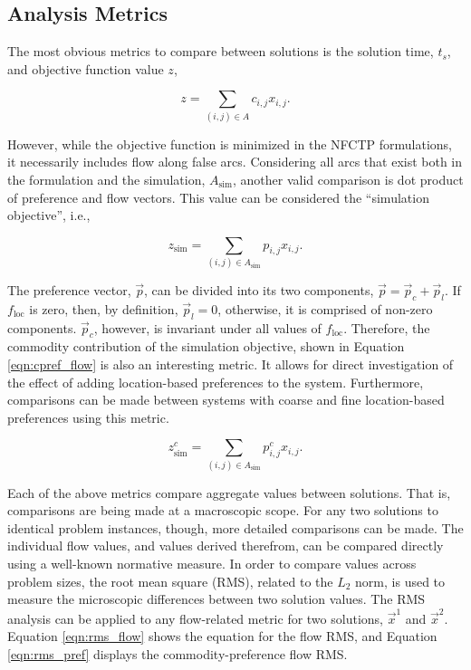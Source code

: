 \subsection{Analysis Metrics}

The most obvious metrics to compare between solutions is the solution time,
$t_s$, and objective function value $z$,

\begin{equation}\label{eqn:obj_flow}
z = \sum_{(i, j) \in A} c_{i, j} x_{i, j}.
\end{equation}

However, while the objective function is minimized in the NFCTP formulations, it
necessarily includes flow along false arcs. Considering all arcs that exist both
in the formulation and the simulation, $A_{\text{sim}}$, another valid
comparison is dot product of preference and flow vectors. This value can be
considered the ``simulation objective'', i.e.,

\begin{equation}\label{eqn:sim_flow}
z_{\text{sim}} = \sum_{(i, j) \in A_{\text{sim}}} p_{i, j} x_{i, j}.
\end{equation}

The preference vector, $\vec{p}$, can be divided into its two components,
$\vec{p} = \vec{p}_c + \vec{p}_l$. If $f_{\text{loc}}$ is zero, then, by
definition, $\vec{p}_l = 0$, otherwise, it is comprised of non-zero
components. $\vec{p}_c$, however, is invariant under all values of
$f_{\text{loc}}$. Therefore, the commodity contribution of the simulation
objective, shown in Equation \ref{eqn:cpref_flow} is also an interesting
metric. It allows for direct investigation of the effect of adding
location-based preferences to the system. Furthermore, comparisons can be made
between systems with coarse and fine location-based preferences using this
metric.

\begin{equation}\label{eqn:cpref_flow}
z^c_{\text{sim}} = \sum_{(i, j) \in A_{\text{sim}}} p^c_{i, j} x_{i, j}.
\end{equation}

Each of the above metrics compare aggregate values between solutions. That is,
comparisons are being made at a macroscopic scope. For any two solutions to
identical problem instances, though, more detailed comparisons can be made. The
individual flow values, and values derived therefrom, can be compared directly
using a well-known normative measure. In order to compare values across problem
sizes, the root mean square (RMS), related to the $L_2$ norm, is used to measure
the microscopic differences between two solution values. The RMS analysis can be
applied to any flow-related metric for two solutions, $\vec{x}^1$ and
$\vec{x}^2$. Equation \ref{eqn:rms_flow} shows the equation for the flow RMS,
and Equation \ref{eqn:rms_pref} displays the commodity-preference flow RMS.

